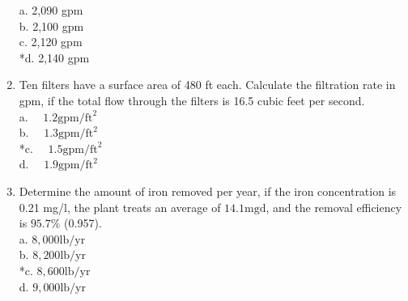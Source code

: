 \begin{enumerate}
a. 2,090 gpm\\
b. 2,100 gpm\\
c. 2,120 gpm\\
*d. 2,140 gpm\\
  \item Ten filters have a surface area of 480 ft each. Calculate the filtration rate in gpm, if the total flow through the filters is 16.5 cubic feet per second.\\
a. $\quad 1.2 \mathrm{gpm} / \mathrm{ft}^{2}$\\
b. $\quad 1.3 \mathrm{gpm} / \mathrm{ft}^{2}$\\
*c. $\quad 1.5 \mathrm{gpm} / \mathrm{ft}^{2}$\\
d. $\quad 1.9 \mathrm{gpm} / \mathrm{ft}^{2}$\\
  \item Determine the amount of iron removed per year, if the iron concentration is 0.21 mg/l, the plant treats an average of $14.1 \mathrm{mgd}$, and the removal efficiency is $95.7 \%$ (0.957).\\
a. $8,000 \mathrm{lb} / \mathrm{yr}$\\
b. $8,200 \mathrm{lb} / \mathrm{yr}$\\
*c. $8,600 \mathrm{lb} / \mathrm{yr}$\\
d. $9,000 \mathrm{lb} / \mathrm{yr}$\\
\end{enumerate}


\newpage
